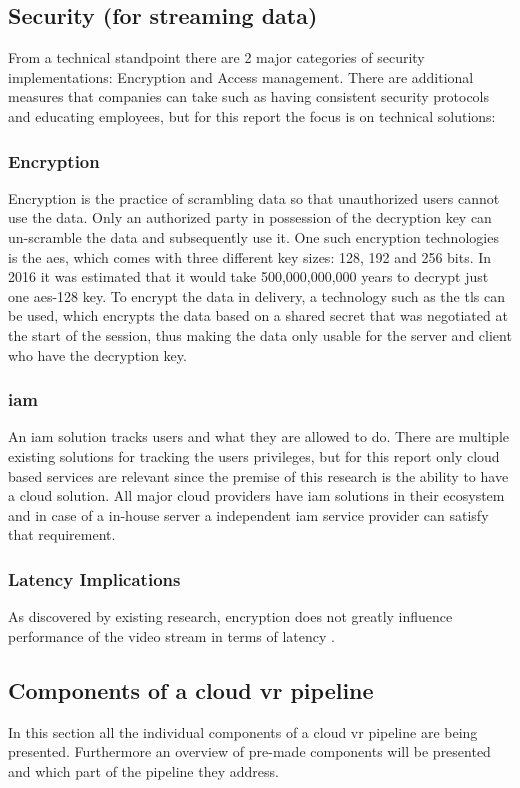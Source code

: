 \subsection{Security (for streaming data)}
From a technical standpoint there are 2 major categories of security implementations: Encryption and Access management. There are additional measures that companies can take such as having consistent security protocols and educating employees, but for this report the focus is on technical solutions:

\subsubsection{Encryption}
Encryption is the practice of scrambling data so that unauthorized users cannot use the data. Only an authorized party in possession of the decryption key can un-scramble the data and subsequently use it. 
One such encryption technologies is the \acrfull{aes}, which comes with three different key sizes: 128, 192 and 256 bits. In 2016 it was estimated that it would take 500,000,000,000 years to decrypt just one \acrshort{aes}-128 key.
To encrypt the data in delivery, a technology such as the \acrfull{tls} can be used, which encrypts the data based on a shared secret that was negotiated at the start of the session, thus making the data only usable for the server and client who have the decryption key.
\subsubsection{\acrfull{iam}}
An \acrshort{iam} solution tracks users and what they are allowed to do. There are multiple existing solutions for tracking the users privileges, but for this report only cloud based services are relevant since the premise of this research is the ability to have a cloud solution. All major cloud providers have \acrshort{iam} solutions in their ecosystem and in case of a in-house server a independent \acrshort{iam} service provider can satisfy that requirement.

\subsubsection{Latency Implications}
As discovered by existing research, encryption does not greatly influence performance of the video stream in terms of latency \parencite{Kaknjo_2019}.

\newpage
\subsection{Components of a cloud \acrshort{vr} pipeline}
In this section all the individual components of a cloud \acrshort{vr} pipeline are being presented. Furthermore an overview of pre-made components will be presented and which part of the pipeline they address.


